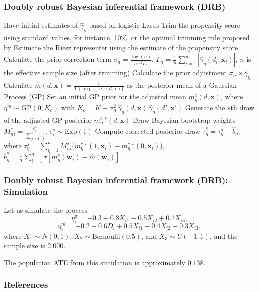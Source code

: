 \documentclass[12pt, compress]{beamer}
\begin{document}
\begin{frame}[fragile]
    \frametitle{Doubly robust Bayesian inferential framework (DRB)}
    
    \begin{algorithm}[H]
        \caption{Double Robust Bayesian Algorithm}\label{Alg:DRBayes}
        \begin{algorithmic}[1]
        {\tiny
            \State Have initial estimates of $\hat{\gamma}_{\eta}$ based on logistic Lasso
            \State Trim the propensity score using standard values, for instance, 10\%, or the optimal trimming rule proposed by \cite{Crump2009Overlap}
            \State Estimate the Riesz representer using the estimate of the propensity score 
            \State Calculate the prior correction term 
            $\sigma_n=\frac{\log(n)}{n^{1/2}\Gamma_n}$, 
            $\Gamma_n=\frac{1}{n}\sum_{i=1}^n |\hat{\gamma}_{\eta}(d_i,\mathbf{x}_i)|$, 
            $n$ is the effective sample size (after trimming)
            \State Calculate the prior adjustment $\sigma_n\times \hat{\gamma}_{\eta}$ 
            \State Calculate $\hat{m}(d,\mathbf{x})=\frac{1}{1+\exp\{-\eta^m(d,\mathbf{x})\}}$ as the posterior mean of a Gaussian Process (GP)
            \State Set an initial GP prior for the adjusted mean 
            $m_{\eta}^c(d,\mathbf{x})$, where $\eta^m \sim \mathrm{GP}(0,K_c)$ with  
            $K_c = K + \sigma_n^2\,\widehat{\gamma}_\eta(d,\mathbf{x})\,\widehat{\gamma}_\eta(d',\mathbf{x}')$
                \State Generate the $s$th draw of the adjusted GP posterior $m_{\eta}^{c,s}(d,\mathbf{x})$
                \State Draw Bayesian bootstrap weights 
                $M^s_{ni}=\frac{e_i^s}{\sum_{j=1}^n e_j^s}$, $e_i^s\sim\mathrm{Exp}(1)$
                \State Compute corrected posterior draw  
                $\tilde{\tau}_{\eta}^s=\tau_{\eta}^s-\hat{b}_{\eta}^s$, where  
                $\tau_{\eta}^s=\sum_{i=1}^n M^s_{ni}\big(m_{\eta}^{c,s}(1,\mathbf{x}_i)-m_{\eta}^{c,s}(0,\mathbf{x}_i)\big)$,  
                $\hat{b}_{\eta}^s=\frac{1}{n}\sum_{i=1}^n\tau[m_{\eta}^s(\mathbf{w}_i)-\hat{m}(\mathbf{w}_i)]$
            \EndFor 
            }
        \end{algorithmic}
    \end{algorithm}
\end{frame}


\begin{frame}
	\frametitle{Doubly robust Bayesian inferential framework (DRB): Simulation}
Let us simulate the process 
\[
\eta^{\pi}_i = -0.3 + 0.8X_{i1} - 0.5X_{i2} + 0.7X_{i3}, 
\]
\[
\eta^{m}_i = -0.2 + 0.6D_i + 0.5X_{i1} - 0.4X_{i2} + 0.3X_{i3},
\]
where $X_{1}\sim N(0,1)$, $X_{2}\sim \mathrm{Bernoulli}(0.5)$, and $X_{3}\sim U(-1,1)$, and the sample size is 2,000.
 
The population ATE from this simulation is approximately $0.138$.
\end{frame}

\begin{frame}[allowframebreaks]
	\frametitle{References}
		{\footnotesize
		
		}
\end{frame}
\end{document}
